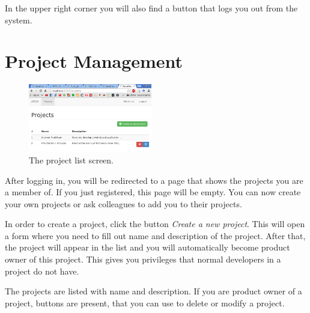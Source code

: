 \documentclass[
	accentcolor=tud1a %
]{tudreport}
\begin{document}
In the upper right corner you will also find a button that logs you out from the system.

\section{Project Management}
\label{sec:project-mgmt}

\begin{figure}
	\centering
	\includegraphics[width=0.48\textwidth]{img/projects}
	\caption{The project list screen.}
	\label{fig:project-list}
\end{figure}

After logging in, you will be redirected to a page that shows the projects you are a member of. If you just registered, this page will be empty. You can now create your own projects or ask colleagues to add you to their projects.

In order to create a project, click the button \emph{Create a new project}. This will open a form where you need to fill out name and description of the project. After that, the project will appear in the list and you will automatically become product owner of this project. This gives you privileges that normal developers in a project do not have.

The projects are listed with name and description. If you are product owner of a project, buttons are present, that you can use to delete or modify a project.
\end{document}

